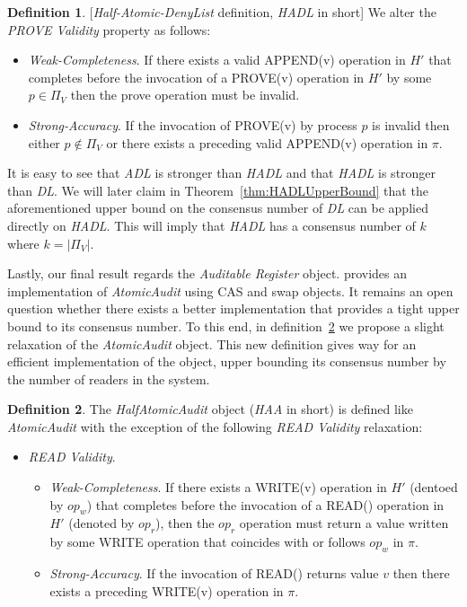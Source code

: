 \documentclass[11pt]{article}
\theoremstyle{definition}
\newtheorem{definition}{Definition}
\begin{document}
\begin{definition}\label{def:ADL}[\textit{Half-Atomic-DenyList} definition, \textit{HADL} in short]
We alter the \textit{\mbox{PROVE} Validity} property as follows:
\begin{itemize}
   \item \textit{Weak-Completeness}. If there exists a valid \mbox{APPEND}(v) operation in $H'$ that completes before the invocation of a \mbox{PROVE}(v) operation in $H'$ by some $p\in \Pi_V$ then the prove operation must be invalid.
  \item \textit{Strong-Accuracy}. If the invocation of \mbox{PROVE}(v) by process $p$ is invalid then either $p\notin \Pi_V$ or there exists a preceding valid APPEND(v) operation in $\pi$.
\end{itemize}
\end{definition}

It is easy to see that \textit{ADL} is stronger than \textit{HADL} and that \textit{HADL} is stronger than \textit{DL}. We will later claim in Theorem~\ref{thm:HADLUpperBound} that the aforementioned upper bound on the consensus number of \textit{DL} can be applied directly on \textit{HADL}. This will imply that \textit{HADL} has a consensus number of $k$ where $k=\vert\Pi_V\vert$.

Lastly, our final result regards the \textit{Auditable Register} object. \cite{AuditableRegs} provides an implementation of \textit{AtomicAudit} using CAS and swap objects. It remains an open question whether there exists a better implementation that provides a tight upper bound to its consensus number.
To this end, in definition~\ref{def:HAA} we propose a slight relaxation of the \textit{AtomicAudit} object. This new definition gives way for an efficient implementation of the object, upper bounding its consensus number by the number of readers in the system.

\begin{definition}
    \label{def:HAA}
    The \textit{HalfAtomicAudit} object (\textit{HAA} in short) is defined like \textit{AtomicAudit} with the exception of the following \textit{READ Validity} relaxation:
    \begin{itemize}
        \item \textit{READ Validity}.
        \begin{itemize}
               \item \textit{Weak-Completeness}. If there exists a \mbox{WRITE}(v) operation in $H'$ (dentoed by $op_w$) that completes before the invocation of a \mbox{READ}() operation in $H'$ (denoted by $op_r$), then the $op_r$ operation must return a value written by some WRITE operation that coincides with or follows $op_w$ in $\pi$.
  \item \textit{Strong-Accuracy}. If the invocation of \mbox{READ}() returns value $v$ then there exists a preceding WRITE(v) operation in $\pi$.
        \end{itemize}
    \end{itemize}
\end{definition}
\end{document}
